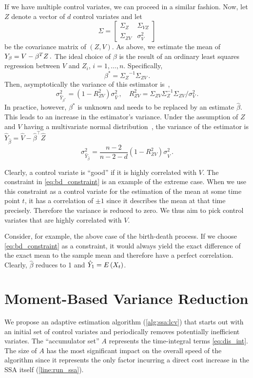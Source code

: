 If we have multiple control variates, we can proceed in a similar fashion.
Now, let ${Z}$ denote a vector of $d$ control variates and let
$$
\Sigma=
\begin{bmatrix}
\Sigma_{ Z} & \Sigma_{V Z}\\
\Sigma_{ Z V} & \sigma_V^2
\end{bmatrix}
$$
be the covariance matrix of $({Z},V)$.
As above, we estimate the mean of
$
    {Y}_{\beta}=V -{\beta}^{T}{Z}\,.
$
The ideal choice of $\beta$ is the result of an ordinary least squares regression between $V$
and $Z_i$, $i=1,\dots,n$.
Specifically, $$\beta^{*}={\Sigma_{ Z}}^{-1}{\Sigma}_{ Z V}\,.$$
Then, asymptotically
the variance of this estimator is~\cite{szechtman2003control},
\begin{equation}\label{eq:lcv_asym}
    {\sigma_{\hat Y_{\beta^*}}^2} = (1 - R_{ Z V}^2){\sigma_{\hat V}^2}\,, \quad
    R_{ Z V}^2=\Sigma_{ Z V}\Sigma_{ Z}^{-1}\Sigma_{ Z V} / \sigma_V^2\,.
\end{equation}
In practice, however, $\beta^*$ is unknown and needs to be replaced by
an estimate $\hat{\beta}$.
This leads to an increase in the estimator's variance.
Under the assumption of $Z$ and $V$ having a multivariate normal
distribution~\cite{cheng1978analysis,lavenberg1982statistical}, the variance of the estimator is
$\hat{Y}_{\hat{\beta}}=\hat{V}-\hat{\beta}^{\top}\hat{ Z}$
\begin{equation}\label{eq:lcv_norm_varred}
    {\sigma_{\hat{Y}_{\hat{\beta}}}^2} = \frac{n - 2}{n - 2 - d}(1 - R_{ ZV}^2){\sigma_{\hat V}^2}\,.
\end{equation}

Clearly, a control  variate is ``good'' if it is highly correlated with $V$.
The constraint in \eqref{eq:bd_constraint} is an example of the extreme case.
When we use this constraint as a control variate
for the estimation of the mean at some time point $t$, it has a correlation of $\pm1$
since it describes the mean at that time precisely.
Therefore the variance is reduced to zero.
We thus aim to pick control  variates that are highly correlated with $V$.

Consider, for example, the above case of the birth-death process.
If we choose \eqref{eq:bd_constraint} as a constraint, it would always yield
the exact difference of the exact mean to the sample mean and therefore have a 
perfect correlation. Clearly, $\hat\beta$ reduces to 1 and $\hat Y_1 = {E}\left(X_t\right)$.

\section{Moment-Based Variance Reduction}\label{sec:cv:algo}
We propose an adaptive estimation algorithm (\autoref{alg:ssa:lcv}) that starts out with
an initial set of control variates
and periodically removes potentially inefficient variates.
The ``accumulator set'' $A$ represents the time-integral terms \eqref{eq:dis_int}.
The size of $A$ has the most significant impact on the overall speed of the algorithm
since it represents the only factor incurring a direct cost increase in the \ac{SSA} itself (\autoref{line:run_ssa}).

